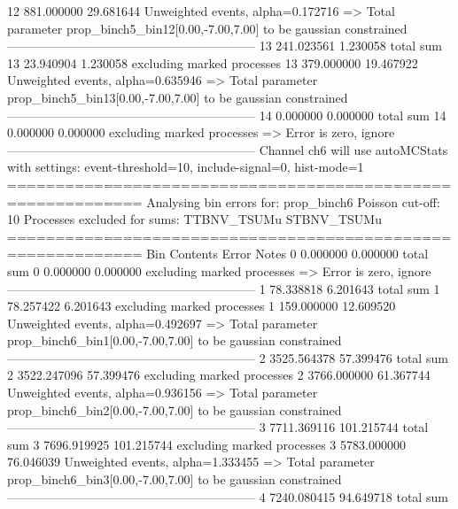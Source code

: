 12         881.000000      29.681644       Unweighted events, alpha=0.172716
  => Total parameter prop_binch5_bin12[0.00,-7.00,7.00] to be gaussian constrained
------------------------------------------------------------
13         241.023561      1.230058        total sum                     
13         23.940904       1.230058        excluding marked processes    
13         379.000000      19.467922       Unweighted events, alpha=0.635946
  => Total parameter prop_binch5_bin13[0.00,-7.00,7.00] to be gaussian constrained
------------------------------------------------------------
14         0.000000        0.000000        total sum                     
14         0.000000        0.000000        excluding marked processes    
  => Error is zero, ignore      
------------------------------------------------------------
Channel ch6 will use autoMCStats with settings: event-threshold=10, include-signal=0, hist-mode=1
============================================================
Analysing bin errors for: prop_binch6
Poisson cut-off: 10
Processes excluded for sums: TTBNV_TSUMu STBNV_TSUMu
============================================================
Bin        Contents        Error           Notes                         
0          0.000000        0.000000        total sum                     
0          0.000000        0.000000        excluding marked processes    
  => Error is zero, ignore      
------------------------------------------------------------
1          78.338818       6.201643        total sum                     
1          78.257422       6.201643        excluding marked processes    
1          159.000000      12.609520       Unweighted events, alpha=0.492697
  => Total parameter prop_binch6_bin1[0.00,-7.00,7.00] to be gaussian constrained
------------------------------------------------------------
2          3525.564378     57.399476       total sum                     
2          3522.247096     57.399476       excluding marked processes    
2          3766.000000     61.367744       Unweighted events, alpha=0.936156
  => Total parameter prop_binch6_bin2[0.00,-7.00,7.00] to be gaussian constrained
------------------------------------------------------------
3          7711.369116     101.215744      total sum                     
3          7696.919925     101.215744      excluding marked processes    
3          5783.000000     76.046039       Unweighted events, alpha=1.333455
  => Total parameter prop_binch6_bin3[0.00,-7.00,7.00] to be gaussian constrained
------------------------------------------------------------
4          7240.080415     94.649718       total sum                     
